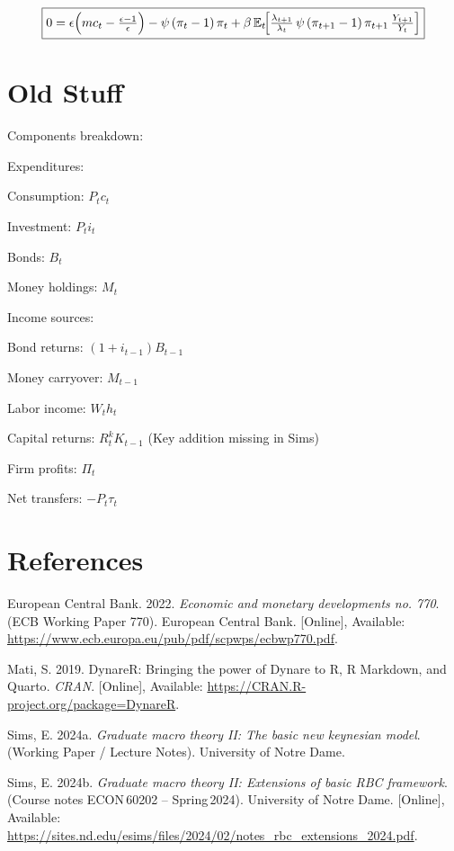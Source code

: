 \documentclass[11pt,preprint]{elsarticle}
\numberwithin{equation}{section}
\numberwithin{figure}{section}
\numberwithin{table}{section}
\newlength{\cslhangindent}
\newenvironment{CSLReferences}[2] %
{\begin{list}{}{%
	\setlength{\itemindent}{0pt}
	\setlength{\leftmargin}{0pt}
	\setlength{\parsep}{0pt}
	\ifodd #1
	\setlength{\leftmargin}{\cslhangindent}
	\setlength{\itemindent}{-1\cslhangindent}
	\fi
	\setlength{\itemsep}{#2\baselineskip}}}
{\end{list}}
\begin{document}
\begin{equation}\label{rotemberg_FOC}
\boxed{
  0 = \epsilon\Bigl(mc_t - \tfrac{\epsilon-1}{\epsilon}\Bigr)
      - \psi\,(\pi_t - 1)\,\pi_t
      + \beta\,\mathbb{E}_t\!
        \Bigl[
          \tfrac{\lambda_{t+1}}{\lambda_t}\,
          \psi\,(\pi_{t+1}-1)\,\pi_{t+1}\,
          \tfrac{Y_{t+1}}{Y_t}
        \Bigr]
}
\end{equation}

\newpage

\newpage

\section{Old Stuff}\label{old-stuff}

Components breakdown:

Expenditures:

Consumption: \(P_t c_t\)

Investment: \(P_t i_t\)

Bonds: \(B_t\)

Money holdings: \(M_t\)

Income sources:

Bond returns: \((1 + i_{t-1}) B_{t-1}\)

Money carryover: \(M_{t-1}\)

Labor income: \(W_t h_t\)

Capital returns: \(R_t^k K_{t-1}\) (Key addition missing in Sims)

Firm profits: \(\Pi_t\)

Net transfers: \(-P_t \tau_t\)

\newpage

\section*{References}\label{references}

\label{refs}
\begin{CSLReferences}{1}{1}
European Central Bank. 2022. \emph{Economic and monetary developments
no. 770}. (ECB Working Paper 770). European Central Bank. {[}Online{]},
Available: \url{https://www.ecb.europa.eu/pub/pdf/scpwps/ecbwp770.pdf}.

Mati, S. 2019. DynareR: Bringing the power of {Dynare} to {R}, {R
Markdown}, and {Quarto}. \emph{CRAN}. {[}Online{]}, Available:
\url{https://CRAN.R-project.org/package=DynareR}.

Sims, E. 2024a. \emph{Graduate macro theory II: The basic new keynesian
model}. (Working Paper / Lecture Notes). University of Notre Dame.

Sims, E. 2024b. \emph{Graduate macro theory II: Extensions of basic RBC
framework}. (Course notes ECON\,60202 -- Spring\,2024). University of
Notre Dame. {[}Online{]}, Available:
\url{https://sites.nd.edu/esims/files/2024/02/notes_rbc_extensions_2024.pdf}.

\end{CSLReferences}


\end{document}
